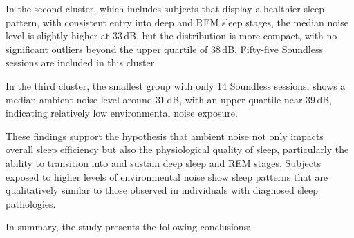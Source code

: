 In the second cluster, which includes subjects that display a healthier sleep pattern, with consistent entry into deep and REM sleep stages, the median noise level is slightly higher at 33 dB, but the distribution is more compact, with no significant outliers beyond the upper quartile of 38 dB. Fifty-five Soundless sessions are included in this cluster.

In the third cluster, the smallest group with only 14 Soundless sessions, shows a median ambient noise level around 31 dB, with an upper quartile near 39 dB, indicating relatively low environmental noise exposure.

These findings support the hypothesis that ambient noise not only impacts overall sleep efficiency but also the physiological quality of sleep, particularly the ability to transition into and sustain deep sleep and REM stages. Subjects exposed to higher levels of environmental noise show sleep patterns that are qualitatively similar to those observed in individuals with diagnosed sleep pathologies.

In summary, the study presents the following conclusions:

